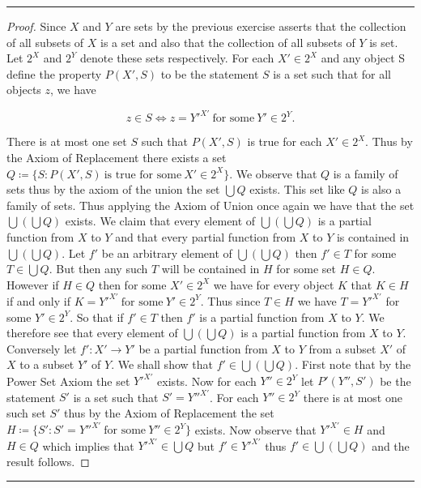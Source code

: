 \documentclass{article}
\newcommand{\lined}{\noindent\rule{\textwidth}{1pt}}
\begin{document}
	\lined
		\begin{proof}
			Since $X$ and $Y$ are sets by the previous exercise asserts that the collection of all subsets of $X$ is a set and also that
			the collection of all subsets of $Y$ is set. Let $2^X$ and $2^Y$ denote these sets respectively. For each $X' \in 2^X$ and any object S define the property $P(X',S)$ to be the statement $S$ is a set such that for all objects $z$, we have 
			
			\[z \in S \iff z = Y'^{X'}\ \text{for some}\  Y' \in 2^Y.\]
			
			\noindent There is at most one set $S$ such that $P(X',S)$ is true for each $X' \in 2^X$. Thus by the Axiom of Replacement there exists a set $Q \coloneqq \{S:P(X',S)\ \text{is true for some}\ X' \in 2^X\}$. We observe that $Q$ is a family of sets thus
			by the axiom of the union the set $\bigcup Q$ exists. This set like $Q$ is also a family of sets. Thus applying the Axiom of Union once again we have that the set $\bigcup(\bigcup Q)$ exists. We claim that every element of $\bigcup(\bigcup Q)$ is a partial function from $X$ to $Y$ and that every partial function from $X$ to $Y$ is contained in $\bigcup(\bigcup Q)$.
			Let $f'$ be an arbitrary element of $\bigcup(\bigcup Q)$ then $f' \in T$ for some $T \in \bigcup Q$. But then any such $T$ will be contained in $H$ for	some set $H \in Q$. However if $H \in Q$ then for some $X' \in 2^X$	 we have for every object $K$ that $K \in H$ if and only if $K = Y'^{X'}\ \text{for some}\  Y' \in 2^Y$. Thus since $T \in H$ we have $T = Y'^{X'}$ for some 
			 $Y' \in 2^Y$. So that if $f' \in T$ then $f'$ is a partial function from $X$ to $Y$. We therefore see that every element of $\bigcup(\bigcup Q)$ is a partial function from $X$ to $Y$. Conversely let $f':X' \rightarrow Y'$ be a partial function from $X$ to $Y$ from a subset $X'$ of $X$ to a subset $Y'$ of $Y$. We shall show that $f' \in \bigcup(\bigcup Q)$. First note that by the Power Set Axiom the set $Y'^{X'}$ exists. Now for each $Y'' \in 2^Y$ let $P'(Y'',S')$ be the statement
			 $S'$ is a set such that $S' = Y''^{X'}$. For each $Y'' \in 2^Y$ there is at most one such set $S'$ thus by the Axiom of Replacement the set $H \coloneqq \{S':S' = Y''^{X'}\ \text{for some}\ Y'' \in 2^Y \}$ exists. Now observe that  $Y'^{X'} \in H$ and $H \in Q$ which implies that $Y'^{X'} \in \bigcup Q$ but $f' \in Y'^{X'}$ thus $f' \in \bigcup(\bigcup Q)$ and the result follows.
			 
		\end{proof}
	\lined
	
\end{document}
